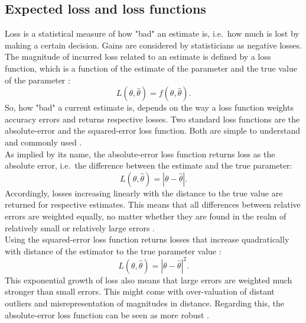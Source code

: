         \subsection{Expected loss and loss functions}\label{sec:loss} 
        Loss is a statistical measure of how "bad" an estimate is, i.e.\ how much is lost by making a certain decision. Gains are considered by statisticians as negative losses.
        The magnitude of incurred loss related to an estimate is defined by a loss function, which is a function of the estimate of the parameter and the true value of the parameter \citep{wald1950statistical, davidson2015}:        
        \begin{equation}\label{eq:LossFunction}
        L(\theta,\hat{\theta}) = f(\theta,\hat{\theta}).
        \end{equation}        
        So, how "bad" a current estimate is, depends on the way a loss function weights accuracy errors and returns respective losses. Two standard loss functions are the absolute-error and the squared-error loss function. Both are simple to understand and commonly used \citep{davidson2015, hennig2007}.\\        
        As implied by its name, the absolute-error loss function returns loss as the absolute error, i.e.\ the difference between the estimate and the true parameter:        
        \begin{equation}\label{eq:AbsLossFunction}
        L(\theta,\hat{\theta}) = |\theta - \hat{\theta}|.
        \end{equation}                
        Accordingly, losses increasing linearly with the distance to the true value are returned for respective estimates. This means that all differences between relative errors are weighted equally, no matter whether they are found in the realm of relatively small or relatively large errors \citep{hennig2007}.\\
        Using the squared-error loss function returns losses that increase quadratically with distance of the estimator to the true parameter value \citep{davidson2015, moye2006statistical}:        
        \begin{equation}\label{eq:SqrLossFunction}
        L(\theta,\hat{\theta}) = |\theta - \hat{\theta}|^2.
        \end{equation}         
        This exponential growth of loss also means that large errors are weighted much stronger than small errors. This might come with over-valuation of distant outliers and misrepresentation of magnitudes in distance. Regarding this, the absolute-error loss function can be seen as more robust \citep{davidson2015}.
